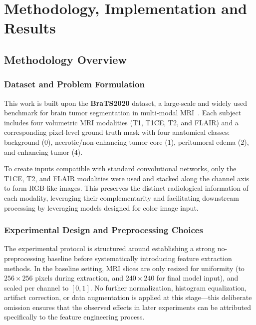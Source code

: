 \setcounter{chapter}{2}

\chapter{Methodology, Implementation and Results}
\label{chap:methodology}

\section{Methodology Overview}
\label{sec:methodology_overview}

\subsection{Dataset and Problem Formulation}
\label{sec:dataset_problem}

This work is built upon the \textbf{BraTS2020} dataset, a large-scale and widely used benchmark for brain tumor segmentation in multi-modal MRI~\cite{brats2020}. Each subject includes four volumetric MRI modalities (T1, T1CE, T2, and FLAIR) and a corresponding pixel-level ground truth mask with four anatomical classes: background (0), necrotic/non-enhancing tumor core (1), peritumoral edema (2), and enhancing tumor (4).

To create inputs compatible with standard convolutional networks, only the T1CE, T2, and FLAIR modalities were used and stacked along the channel axis to form RGB-like images. This preserves the distinct radiological information of each modality, leveraging their complementarity and facilitating downstream processing by leveraging models designed for color image input.

\subsection{Experimental Design and Preprocessing Choices}
\label{sec:exp_design_preproc}

The experimental protocol is structured around establishing a strong no-preprocessing baseline before systematically introducing feature extraction methods. In the baseline setting, MRI slices are only resized for uniformity (to $256 \times 256$ pixels during extraction, and $240 \times 240$ for final model input), and scaled per channel to $[0,1]$. No further normalization, histogram equalization, artifact correction, or data augmentation is applied at this stage---this deliberate omission ensures that the observed effects in later experiments can be attributed specifically to the feature engineering process.


